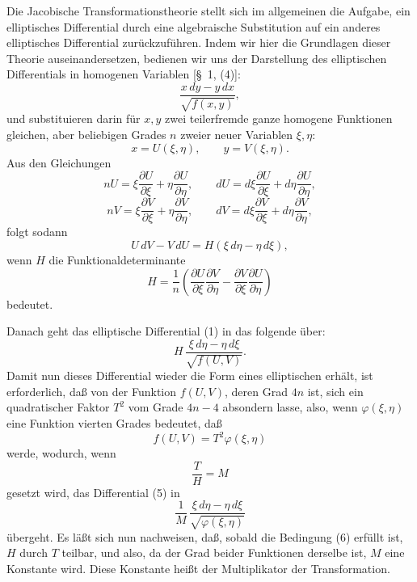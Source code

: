\documentclass[11pt]{article}
\begin{document}
Die Jacobische Transformationstheorie stellt sich im allgemeinen die Aufgabe, ein elliptisches Differential durch eine algebraische Substitution auf ein anderes elliptisches Differential zurückzuführen. Indem wir hier die Grundlagen dieser Theorie auseinandersetzen, bedienen wir uns der Darstellung des elliptischen Differentials in homogenen Variablen [\S~1, (4)]:
\begin{equation}
\frac{x\,dy-y\,dx}{\sqrt{f(x,y)}},
\tag{1}
\end{equation}
und substituieren darin für $x,y$ zwei teilerfremde ganze homogene Funktionen gleichen, aber beliebigen Grades $n$ zweier neuer Variablen $\xi,\eta$:
\begin{equation}
x=U(\xi,\eta),\qquad y=V(\xi,\eta).
\tag{2}
\end{equation}
Aus den Gleichungen
\[
nU=\xi\frac{\partial U}{\partial\xi}+\eta\frac{\partial U}{\partial\eta},\qquad
dU=d\xi\frac{\partial U}{\partial\xi}+d\eta\frac{\partial U}{\partial\eta},
\]
\[
nV=\xi\frac{\partial V}{\partial\xi}+\eta\frac{\partial V}{\partial\eta},\qquad
dV=d\xi\frac{\partial V}{\partial\xi}+d\eta\frac{\partial V}{\partial\eta},
\]
folgt sodann
\begin{equation}
U\,dV-V\,dU=H(\xi\,d\eta-\eta\,d\xi),
\tag{3}
\end{equation}
wenn $H$ die Funktionaldeterminante
\begin{equation}
H=\frac1n\left(
\frac{\partial U}{\partial\xi}\frac{\partial V}{\partial\eta}
-
\frac{\partial V}{\partial\xi}\frac{\partial U}{\partial\eta}
\right)
\tag{4}
\end{equation}
bedeutet.

Danach geht das elliptische Differential (1) in das folgende über:
\begin{equation}
H\,\frac{\xi\,d\eta-\eta\,d\xi}{\sqrt{f(U,V)}}.
\tag{5}
\end{equation}
Damit nun dieses Differential wieder die Form eines elliptischen erhält, ist erforderlich, daß von der Funktion $f(U,V)$, deren Grad $4n$ ist, sich ein quadratischer Faktor $T^2$ vom Grade $4n-4$ absondern lasse, also, wenn $\varphi(\xi,\eta)$ eine Funktion vierten Grades bedeutet, daß
\begin{equation}
f(U,V)=T^2\varphi(\xi,\eta)
\tag{6}
\end{equation}
werde, wodurch, wenn
\begin{equation}
\frac{T}{H}=M
\tag{7}
\end{equation}
gesetzt wird, das Differential (5) in
\begin{equation}
\frac1M\,\frac{\xi\,d\eta-\eta\,d\xi}{\sqrt{\varphi(\xi,\eta)}}
\tag{8}
\end{equation}
übergeht. Es läßt sich nun nachweisen, daß, sobald die Bedingung (6) erfüllt ist, $H$ durch $T$ teilbar, und also, da der Grad beider Funktionen derselbe ist, $M$ eine Konstante wird. Diese Konstante heißt der Multiplikator der Transformation.
\end{document}
